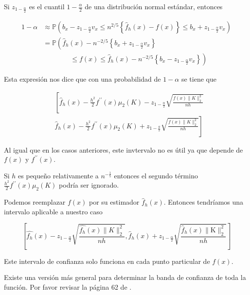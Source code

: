 \documentclass[12pt]{book}\usepackage[]{graphicx}\usepackage[]{color}
\theoremstyle{definition}
\theoremstyle{plain}
\begin{document}
Si \(z_{1-\frac{\alpha}{2}}\) es el cuantil \(1-\frac{\alpha}{2}\) de una distribución normal estándar, entonces

\begin{align*}
	1-\alpha
	  & \approx \mathbb{P}\left(b_{x}-z_{1-\frac{\alpha}{2}} v_{x} \leq n^{2 / 5}\left\{\widehat{f}_{h}(x)-f(x)\right\} \leq b_{x}+z_{1-\frac{\alpha}{2}} v_{x}\right) \\
	  & =\mathbb{P}\left(\widehat{f}_{h}(x)-n^{-2 / 5}\left\{b_{x}+z_{1-\frac{\alpha}{2}} v_{x}\right\}\right.                                                         \\
	  & \qquad\qquad \left. \leq f(x)\leq \hat{f}_{h}(x)-n^{-2 / 5}\left\{b_{x}-z_{1-\frac{\alpha}{2}} v_{x}\right\}\right)
\end{align*}

Esta expresión nos dice que con una probabilidad de  \(1-\alpha\) se tiene que

\begin{equation*}
	\begin{aligned}
		  & \left[\hat{f}_{h}(x)-\frac{h^{2}}{2} f^{\prime \prime}(x) \mu_{2}(K)-z_{1-\frac{\alpha}{2}} \sqrt{\frac{f(x)\|K\|_{2}^{2}}{n h}}\right. \\
		  & \left.\widehat{f}_{h}(x)-\frac{h^{2}}{2} f^{\prime \prime}(x) \mu_{2}(K)+z_{1-\frac{a}{2}} \sqrt{\frac{f(x)\|K\|_{2}^{2}}{n h}}\right]
	\end{aligned}
\end{equation*}

Al igual que en los casos anteriores, este invtervalo no es útil ya que depende de \(f(x)\) y \(f^{\prime\prime} (x)\).

Si \(h\) es pequeño relativamente a \(n^{-\frac{1}{5}}\) entonces el segundo término \(\frac{h^{2}}{2} f^{\prime \prime}(x) \mu_{2}(K)\) podría ser ignorado.

Podemos reemplazar \(f(x)\) por su estimador \(\hat{f}_{h}(x)\).  Entonces tendríamos una intervalo aplicable a nuestro caso

\begin{equation*}
	\left[\hat{f_{h}}(x)-z_{1-\frac{\alpha}{2}} \sqrt{\frac{\hat{f_{h}}(x)\|K\|_{2}^{2}}{n h}}, \hat{f}_{h}(x)+z_{1-\frac{\alpha}{2}} \sqrt{\frac{\hat{f}_{h}(x)\|\mathrm{K}\|_{2}^{2}}{n h}}\right]
\end{equation*}

\begin{nota}{}{}
	Este intervalo de confianza solo funciona en cada punto particular de \(f(x)\).

	Existe una versión más general para determinar la banda de confianza de toda la función. Por favor revisar la página 62 de \textcite{Hardle2004}.
\end{nota}
\newpage
\end{document}

